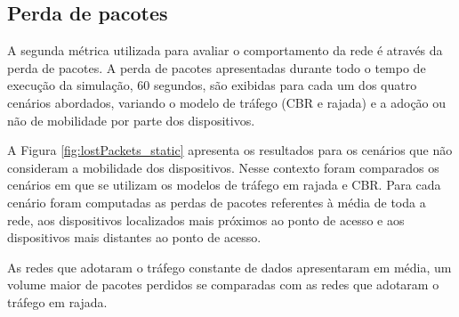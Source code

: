 \documentclass[12pt]{article}
\begin{document}



\subsection{Perda de pacotes}\label{subsec:perda}

A segunda métrica utilizada para avaliar o comportamento da rede é através da perda de pacotes. A perda de pacotes apresentadas durante todo o tempo de execução da simulação, 60 segundos, são exibidas para cada um dos quatro cenários abordados, variando o modelo de tráfego (CBR e rajada) e a adoção ou não de mobilidade por parte dos dispositivos.

A Figura \ref{fig:lostPackets_static} apresenta os resultados para os cenários que não consideram a mobilidade dos dispositivos. Nesse contexto foram comparados os cenários em que se utilizam os modelos de tráfego em rajada e CBR. Para cada cenário foram computadas as perdas de pacotes referentes à média de toda a rede, aos dispositivos localizados mais próximos ao ponto de acesso e aos dispositivos mais distantes ao ponto de acesso.

As redes que adotaram o tráfego constante de dados apresentaram em média, um volume maior de pacotes perdidos se comparadas com as redes que adotaram o tráfego em rajada.
\end{document}
